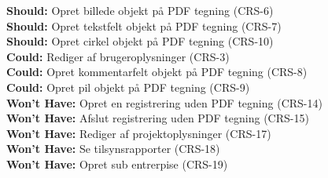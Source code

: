 \textbf{Should:} Opret billede objekt på PDF tegning (CRS-6) \\
\textbf{Should:} Opret tekstfelt objekt på PDF tegning (CRS-7) \\
\textbf{Should:} Opret cirkel objekt på PDF tegning (CRS-10) \\

\textbf{Could:} Rediger af brugeroplysninger (CRS-3) \\
\textbf{Could:} Opret kommentarfelt objekt på PDF tegning (CRS-8) \\
\textbf{Could:} Opret pil objekt på PDF tegning (CRS-9) \\

\textbf{Won't Have:} Opret en registrering uden PDF tegning (CRS-14) \\
\textbf{Won't Have:} Afslut registrering uden PDF tegning (CRS-15) \\
\textbf{Won't Have:} Rediger af projektoplysninger (CRS-17) \\
\textbf{Won't Have:} Se tilsynsrapporter (CRS-18) \\
\textbf{Won't Have:} Opret sub entrerpise (CRS-19)



